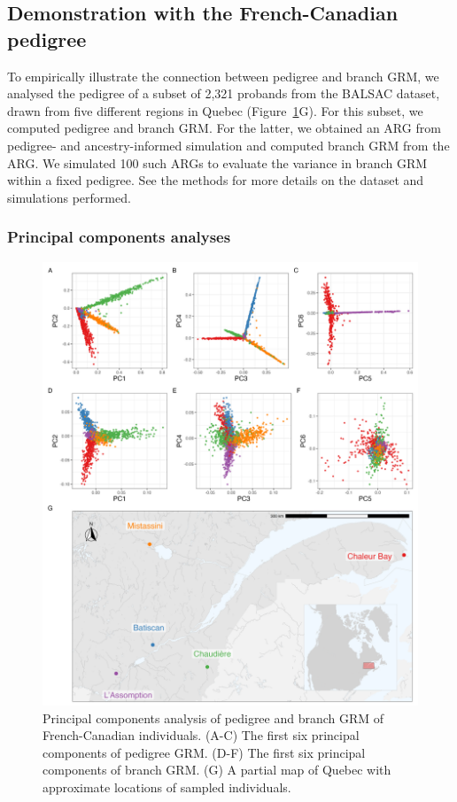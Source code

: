 \subsection{Demonstration with the French-Canadian pedigree}

To empirically illustrate the connection between pedigree and branch GRM,
we analysed the pedigree of a subset of 2,321 probands from the BALSAC dataset,
drawn from five different regions in Quebec (Figure~\ref{fig:PCA_map}G).
%
For this subset, we computed pedigree and branch GRM.
%
For the latter, we obtained an ARG from pedigree- and ancestry-informed simulation
and computed branch GRM from the ARG.
%
We simulated 100 such ARGs to evaluate the variance in branch GRM within a fixed pedigree.
See the methods for more details on the dataset and simulations performed.

\subsubsection{Principal components analyses}

\begin{figure}
    \centering
    \includegraphics[width = \textwidth]{Figures/map_and_pca_grid4.jpg}
    \caption{Principal components analysis of pedigree and branch GRM of French-Canadian individuals.
    (A-C) The first six principal components of pedigree GRM.
    (D-F) The first six principal components of branch GRM.
    (G) A partial map of Quebec with approximate locations of sampled individuals. \label{fig:PCA_map}}
\end{figure}


